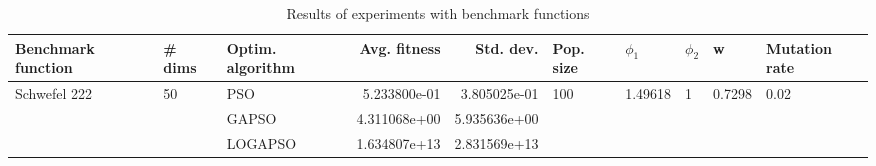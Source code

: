 \begin{table}
\centering
\caption{Results of experiments with benchmark functions}
\begin{tabular}{lllrrlllll}
\toprule
           Benchmark function &             \# dims & Optim. algorithm &  Avg. fitness &    Std. dev. &            Pop. size &               $\phi_{1}$ &         $\phi_{2}$ &                       w &         Mutation rate \\
\midrule
\multirow{3}{*}{Schwefel 222} & \multirow{3}{*}{50} &              PSO &  5.233800e-01 & 3.805025e-01 & \multirow{3}{*}{100} & \multirow{3}{*}{1.49618} & \multirow{3}{*}{1} & \multirow{3}{*}{0.7298} & \multirow{3}{*}{0.02} \\
                              &                     &            GAPSO &  4.311068e+00 & 5.935636e+00 &                      &                          &                    &                         &                       \\
                              &                     &          LOGAPSO &  1.634807e+13 & 2.831569e+13 &                      &                          &                    &                         &                       \\
\bottomrule
\end{tabular}
\end{table}
